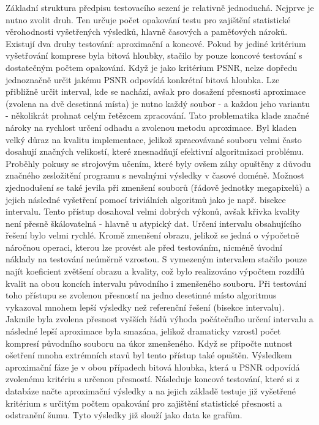 Základní struktura předpisu testovacího sezení je relativně jednoduchá. Nejprve je nutno zvolit druh. Ten určuje počet opakování testu pro zajištění statistické věrohodnosti vyšetřených výsledků, hlavně časových a paměťových nároků. Existují dva druhy testování: aproximační a koncové. Pokud by jediné kritérium vyšetřování komprese byla bitová hloubky, stačilo by pouze koncové testování s dostatečným počtem opakování. Když je jako kritérium PSNR, nelze dopředu jednoznačně určit jakému PSNR odpovídá konkrétní bitová hloubka. Lze přibližně určit interval, kde se nachází, avšak pro dosažení přesnosti aproximace (zvolena na dvě desetinná místa) je nutno každý soubor - a každou jeho variantu - několikrát prohnat celým řetězcem zpracování. Tato problematika klade značné nároky na rychlost určení odhadu a zvolenou metodu aproximace. Byl kladen velký důraz na kvalitu implementace, jelikož zpracovávané souboru velmi často dosahují značných velikostí, které znesnadňují efektivní algoritmizaci problému. Proběhly pokusy se strojovým učením, které byly ovšem záhy opuštěny z důvodu značného zesložitění programu s nevalnými výsledky v časové doméně. Možnost zjednodušení se také jevila při zmenšení souborů (řádově jednotky megapixelů) a jejich následné vyšetření pomocí triviálních algoritmů jako je např. bisekce intervalu. Tento přístup dosahoval velmi dobrých výkonů, avšak křivka kvality není přesně škálovatelná - hlavně u atypický dat. Určení intervalu obsahujícího řešení bylo velmi rychlé. Kromě zmenšení obrazu, jelikož se jedná o výpočetně náročnou operaci, kterou lze provést ale před testováním, nicméně úvodní náklady na testování neúměrně vzrostou. S vymezeným intervalem stačilo pouze najít koeficient zvětšení obrazu a kvality, což bylo realizováno výpočtem rozdílů kvalit na obou koncích intervalu původního i zmenšeného souboru. Při testování toho přístupu se zvolenou přesností na jedno desetinné místo algoritmus vykazoval mnohem lepší výsledky než referenční řešení (bisekce intervalu). Jakmile byla zvolena přesnost vyšších řádů výhoda počátečního určení intervalu a následné lepší aproximace byla smazána, jelikož dramaticky vzrostl počet kompresí původního souboru na úkor zmenšeného. Když se připočte nutnost ošetření mnoha extrémních stavů byl tento přístup také opuštěn. Výsledkem aproximační fáze je v obou případech bitová hloubka, která u PSNR odpovídá zvolenému kritériu s určenou přesností. Následuje koncové testování, které si z databáze načte aproximační výsledky a na jejich základě testuje již vyšetřené kritérium s určitým počtem opakování pro zajištění statistické přesnosti a odstranění šumu. Tyto výsledky již slouží jako data ke grafům.\\
